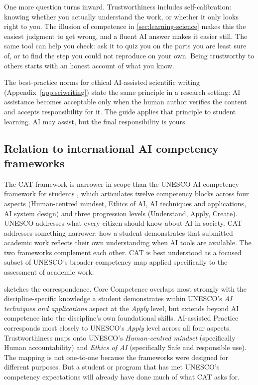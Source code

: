 \documentclass{SIAMbook2023}
\begin{document}
One more question turns inward. Trustworthiness includes self-calibration: knowing whether you actually understand the work, or whether it only looks right to you. The illusion of competence in \cref{sec:learning-science} makes this the easiest judgment to get wrong, and a fluent AI answer makes it easier still. The same tool can help you check: ask it to quiz you on the parts you are least sure of, or to find the step you could not reproduce on your own. Being trustworthy to others starts with an honest account of what you know.

The best-practice norms for ethical AI-assisted scientific writing (Appendix~\ref{app:sciwriting}) state the same principle in a research setting: AI assistance becomes acceptable only when the human author verifies the content and accepts responsibility for it. The guide applies that principle to student learning. AI may assist, but the final responsibility is yours.

\subsection{Relation to international AI competency frameworks}
\label{subsec:cat-unesco}%

The CAT framework is narrower in scope than the UNESCO AI competency framework for students \citep{miao2024aia}, which articulates twelve competency blocks across four aspects (Human-centred mindset, Ethics of AI, AI techniques and applications, AI system design) and three progression levels (Understand, Apply, Create). UNESCO addresses what every citizen should know about AI in society. CAT addresses something narrower: how a student demonstrates that submitted academic work reflects their own understanding when AI tools are available. The two frameworks complement each other. CAT is best understood as a focused subset of UNESCO's broader competency map applied specifically to the assessment of academic work.

 sketches the correspondence. Core Competence overlaps most strongly with the discipline-specific knowledge a student demonstrates within UNESCO's \emph{AI techniques and applications} aspect at the \emph{Apply} level, but extends beyond AI competence into the discipline's own foundational skills. AI-assisted Practice corresponds most closely to UNESCO's \emph{Apply} level across all four aspects. Trustworthiness maps onto UNESCO's \emph{Human-centred mindset} (specifically Human accountability) and \emph{Ethics of AI} (specifically Safe and responsible use). The mapping is not one-to-one because the frameworks were designed for different purposes. But a student or program that has met UNESCO's competency expectations will already have done much of what CAT asks for.
\end{document}
